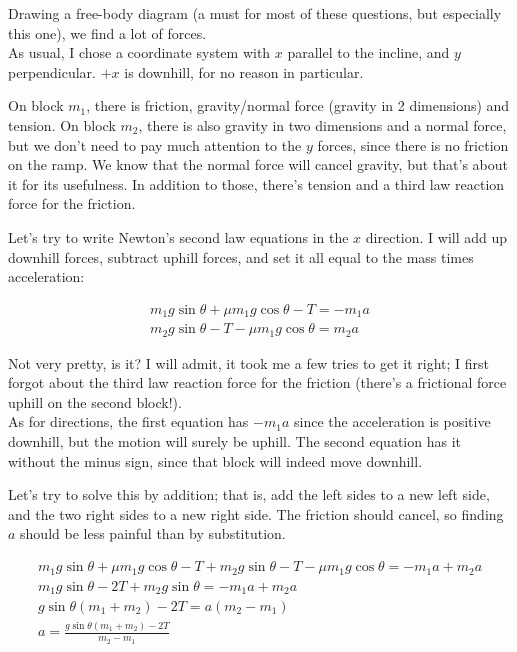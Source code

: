 \documentclass[12pt,a4paper]{report}
\begin{document}
Drawing a free-body diagram (a must for most of these questions, but especially this one), we find a lot of forces.\\
As usual, I chose a coordinate system with $x$ parallel to the incline, and $y$ perpendicular. $+x$ is downhill, for no reason in particular.

On block $m_1$, there is friction, gravity/normal force (gravity in 2 dimensions) and tension. On block $m_2$, there is also gravity in two dimensions and a normal force, but we don't need to pay much attention to the $y$ forces, since there is no friction on the ramp. We know that the normal force will cancel gravity, but that's about it for its usefulness. In addition to those, there's tension and a third law reaction force for the friction.

Let's try to write Newton's second law equations in the $x$ direction. I will add up downhill forces, subtract uphill forces, and set it all equal to the mass times acceleration:

\begin{align}
m_1 g \sin \theta + \mu m_1 g \cos \theta - T = - m_1 a\\
m_2 g \sin \theta - T - \mu m_1 g \cos \theta = m_2 a
\end{align}

Not very pretty, is it? I will admit, it took me a few tries to get it right; I first forgot about the third law reaction force for the friction (there's a frictional force uphill on the second block!).\\
As for directions, the first equation has $-m_1 a$ since the acceleration is positive downhill, but the motion will surely be uphill. The second equation has it without the minus sign, since that block will indeed move downhill.

Let's try to solve this by addition; that is, add the left sides to a new left side, and the two right sides to a new right side. The friction should cancel, so finding $a$ should be less painful than by substitution.

\begin{align}
m_1 g \sin \theta + \mu m_1 g \cos \theta - T + m_2 g \sin \theta - T - \mu m_1 g \cos \theta = - m_1 a + m_2 a\\
m_1 g \sin \theta - 2T + m_2 g \sin \theta  = - m_1 a + m_2 a\\
g \sin \theta(m_1 + m_2) - 2T = a(m_2 - m_1)\\
a = \frac{g \sin \theta(m_1 + m_2) - 2T}{m_2 - m_1}
\end{align}
\end{document}
